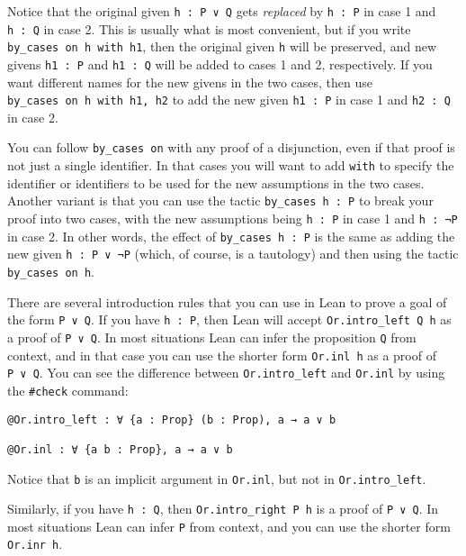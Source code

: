 \documentclass[
  letterpaper,
  DIV=11,
  numbers=noendperiod]{scrreprt}
\newenvironment{ind}
	{\begin{list}{}{\setlength{\leftmargin}{1em}}\item\relax}
	{\end{list}}
\theoremstyle{remark}
\begin{document}
Notice that the original given \texttt{h\ :\ P\ ∨\ Q} gets
\emph{replaced} by \texttt{h\ :\ P} in case 1 and \texttt{h\ :\ Q} in
case 2. This is usually what is most convenient, but if you write
\texttt{by\_cases\ on\ h\ with\ h1}, then the original given \texttt{h}
will be preserved, and new givens \texttt{h1\ :\ P} and
\texttt{h1\ :\ Q} will be added to cases 1 and 2, respectively. If you
want different names for the new givens in the two cases, then use
\texttt{by\_cases\ on\ h\ with\ h1,\ h2} to add the new given
\texttt{h1\ :\ P} in case 1 and \texttt{h2\ :\ Q} in case 2.

You can follow \texttt{by\_cases\ on} with any proof of a disjunction,
even if that proof is not just a single identifier. In that cases you
will want to add \texttt{with} to specify the identifier or identifiers
to be used for the new assumptions in the two cases. Another variant is
that you can use the tactic \texttt{by\_cases\ h\ :\ P} to break your
proof into two cases, with the new assumptions being \texttt{h\ :\ P} in
case 1 and \texttt{h\ :\ ¬P} in case 2. In other words, the effect of
\texttt{by\_cases\ h\ :\ P} is the same as adding the new given
\texttt{h\ :\ P\ ∨\ ¬P} (which, of course, is a tautology) and then
using the tactic \texttt{by\_cases\ on\ h}.

There are several introduction rules that you can use in Lean to prove a
goal of the form \texttt{P\ ∨\ Q}. If you have \texttt{h\ :\ P}, then
Lean will accept \texttt{Or.intro\_left\ Q\ h} as a proof of
\texttt{P\ ∨\ Q}. In most situations Lean can infer the proposition
\texttt{Q} from context, and in that case you can use the shorter form
\texttt{Or.inl\ h} as a proof of \texttt{P\ ∨\ Q}. You can see the
difference between \texttt{Or.intro\_left} and \texttt{Or.inl} by using
the \texttt{\#check} command:

\begin{ind}

\begin{verbatim}
@Or.intro_left : ∀ {a : Prop} (b : Prop), a → a ∨ b

@Or.inl : ∀ {a b : Prop}, a → a ∨ b
\end{verbatim}

\end{ind}

Notice that \texttt{b} is an implicit argument in \texttt{Or.inl}, but
not in \texttt{Or.intro\_left}.

Similarly, if you have \texttt{h\ :\ Q}, then
\texttt{Or.intro\_right\ P\ h} is a proof of \texttt{P\ ∨\ Q}. In most
situations Lean can infer \texttt{P} from context, and you can use the
shorter form \texttt{Or.inr\ h}.
\end{document}
